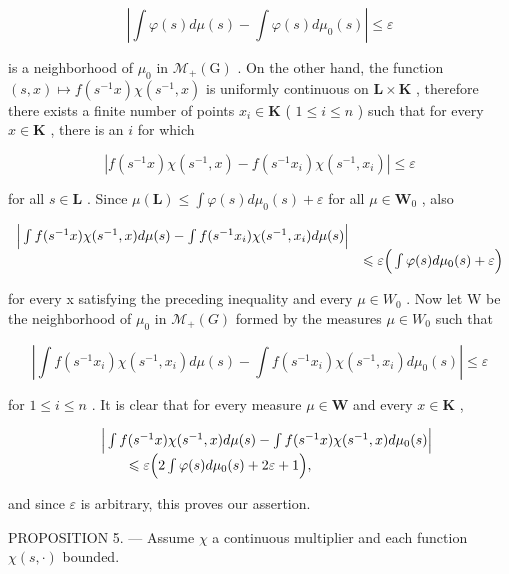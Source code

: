 \[
\left| \int \varphi (s) d \mu (s) - \int \varphi (s) d \mu_ {0} (s) \right| \leqslant \varepsilon
\]

is a neighborhood of \(\mu_0\) in \(\mathcal{M}_{+}(\mathrm{G})\) . On the other hand, the function \((s,x)\mapsto f(s^{-1}x)\chi (s^{-1},x)\) is uniformly continuous on \(\mathbf{L}\times \mathbf{K}\) , therefore there exists a finite number of points \(x_{i}\in \mathbf{K}\) ( \(1\leqslant i\leqslant n\) ) such that for every \(x\in \mathbf{K}\) , there is an \(i\) for which

\[
\left| f (s ^ {- 1} x) \chi (s ^ {- 1}, x) - f (s ^ {- 1} x _ {i}) \chi (s ^ {- 1}, x _ {i}) \right| \leqslant \varepsilon
\]

for all \(s \in \mathbf{L}\) . Since \(\mu(\mathbf{L}) \leqslant \int \varphi(s) d\mu_0(s) + \varepsilon\) for all \(\mu \in \mathbf{W}_0\) , also

\[
\begin{array}{r l} \Big | \int f (s ^ {- 1} x) \chi (s ^ {- 1}, x) d \mu (s) - \int f (s ^ {- 1} x _ {i}) \chi (s ^ {- 1}, x _ {i}) d \mu (s) \Big | & \\ & \leqslant \varepsilon \Big (\int \varphi (s) d \mu_ {0} (s) + \varepsilon \Big) \end{array}
\]

for every x satisfying the preceding inequality and every \(\mu \in W_{0}\) . Now let W be the neighborhood of \(\mu_{0}\) in \(\mathcal{M}_{+}(G)\) formed by the measures \(\mu \in W_{0}\) such that

\[
\left| \int f (s ^ {- 1} x _ {i}) \chi (s ^ {- 1}, x _ {i}) d \mu (s) - \int f (s ^ {- 1} x _ {i}) \chi (s ^ {- 1}, x _ {i}) d \mu_ {0} (s) \right| \leqslant \varepsilon
\]

for \(1 \leqslant i \leqslant n\) . It is clear that for every measure \(\mu \in \mathbf{W}\) and every \(x \in \mathbf{K}\) ,

\[
\begin{array}{r l} & {\Big | \int f (s ^ {- 1} x) \chi (s ^ {- 1}, x) d \mu (s) - \int f (s ^ {- 1} x) \chi (s ^ {- 1}, x) d \mu_ {0} (s) \Big |} \\ & {\qquad \leqslant \varepsilon \Big (2 \int \varphi (s) d \mu_ {0} (s) + 2 \varepsilon + 1 \Big),} \end{array}
\]

and since \(\varepsilon\) is arbitrary, this proves our assertion.

PROPOSITION 5. --- Assume \(\chi\) a continuous multiplier and each function \(\chi(s,\cdot)\) bounded.

